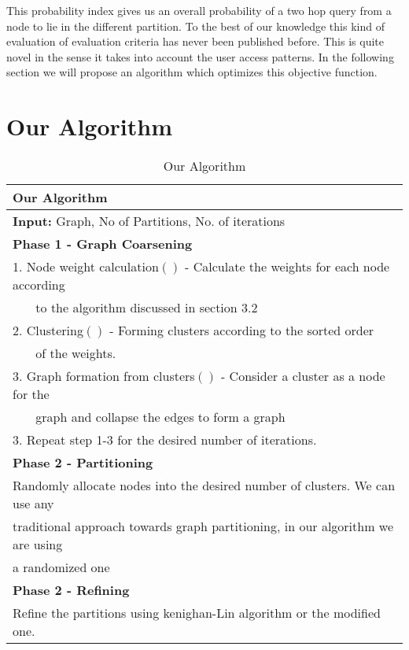 \documentclass[letterpaper]{article}
\begin{document}
        This probability index gives us an overall probability of a two hop
query from a node to lie in the different partition. To the best of our
knowledge this kind of evaluation of evaluation criteria has never been
published before. This is quite novel in the sense it takes into account the
user access patterns.  In the following section we will propose an algorithm
which optimizes this objective function.

\section{Our Algorithm}
\begin{table*}[htb]
\centering
\begin{tabular}{|l|}%
\hline
\textbf{Our Algorithm}\\
\hline
\textbf{Input: }Graph, No of Partitions, No. of iterations\\
\hline
\textbf{Phase 1 - Graph Coarsening }\\
1. Node weight calculation$()$ - Calculate the weights for each node according \\
~~~ to the algorithm discussed in section 3.2\\
2. Clustering$()$ - Forming clusters according to the sorted order\\
~~~ of the weights.\\
3. Graph formation from clusters$()$ - Consider a cluster as a node for the\\
~~~ graph and collapse the edges to form a graph\\
3. Repeat step 1-3 for the desired number of iterations.\\


\textbf{Phase 2 - Partitioning}\\
 Randomly allocate nodes into the desired number of clusters. We can use any\\
traditional approach towards graph partitioning, in our algorithm  we are using\\
a randomized one\\

\textbf{Phase 2 - Refining}\\
 Refine the partitions using kenighan-Lin algorithm or the modified one.\\
\hline
\end{tabular}
\caption{Our Algorithm}
\label{alg}
\end{table*}
\end{document}
